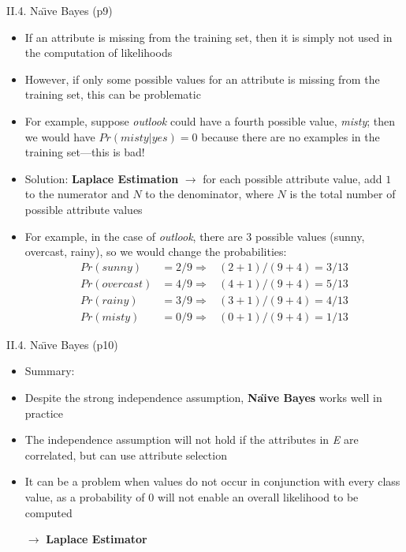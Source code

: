 \documentclass[handout]{beamer}
\newcommand{\strong}[1]{\textbf{\color{teal} #1}}
\newcommand{\stronger}[1]{\textbf{\color{purple} #1}}
\begin{document}
\begin{frame}{II.4. Na\"{\i}ve Bayes (p9)}
\begin{itemize}
\item If an attribute is missing from the training set, then it is simply not used in the computation of likelihoods
\item However, if only some possible values for an attribute is missing from the training set, this can be problematic
\item For example, suppose \emph{outlook} could have a fourth possible value, \emph{misty};
then we would have $Pr(misty|yes)=0$ because there are no examples in the training set---this is bad!
\item Solution: \stronger{Laplace Estimation} $\rightarrow$
for each possible attribute value, add $1$ to the numerator and $N$ to the denominator, where $N$ is the total number of possible attribute values
\item For example, in the case of \emph{outlook}, there are $3$ possible values (sunny, overcast, rainy), so we would change the probabilities:
\begin{eqnarray*}
Pr(sunny)    & = 2/9  \Rightarrow & (2+1) / (9+4) = 3/13 \\
Pr(overcast) & = 4/9  \Rightarrow & (4+1) / (9+4) = 5/13 \\
Pr(rainy)    & = 3/9  \Rightarrow & (3+1) / (9+4) = 4/13 \\
Pr(misty)    & = 0/9  \Rightarrow & (0+1) / (9+4) = 1/13 
\end{eqnarray*}
\end{itemize}
\end{frame}
\begin{frame}{II.4. Na\"{\i}ve Bayes (p10)}
\begin{itemize}
\item Summary:
\item Despite the strong independence assumption, \stronger{Na\"{\i}ve Bayes} works well in practice
\item The independence assumption will not hold if the attributes in \emph{E} are correlated, but can use attribute selection
\item It can be a problem when values do not occur in conjunction with every class value, as a probability of 0 will not enable an overall likelihood to be computed
\item[$\rightarrow$] \strong{Laplace Estimator}
\end{itemize}
\end{frame}
\end{document}
